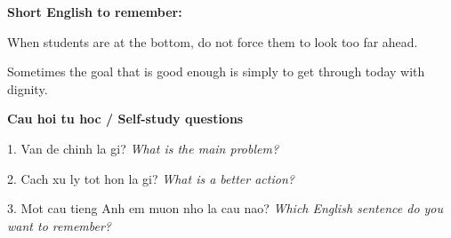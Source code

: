 \begin{ghinhoanh}
\textbf{Short English to remember:}

When students are at the bottom, do not force them to look too far ahead.

Sometimes the goal that is good enough is simply to get through today with dignity.

\end{ghinhoanh}

\begin{tuhocnhanh}
\textbf{Cau hoi tu hoc / Self-study questions}

1. Van de chinh la gi? \textit{What is the main problem?}

2. Cach xu ly tot hon la gi? \textit{What is a better action?}

3. Mot cau tieng Anh em muon nho la cau nao? \textit{Which English sentence do you want to remember?}
\end{tuhocnhanh}
